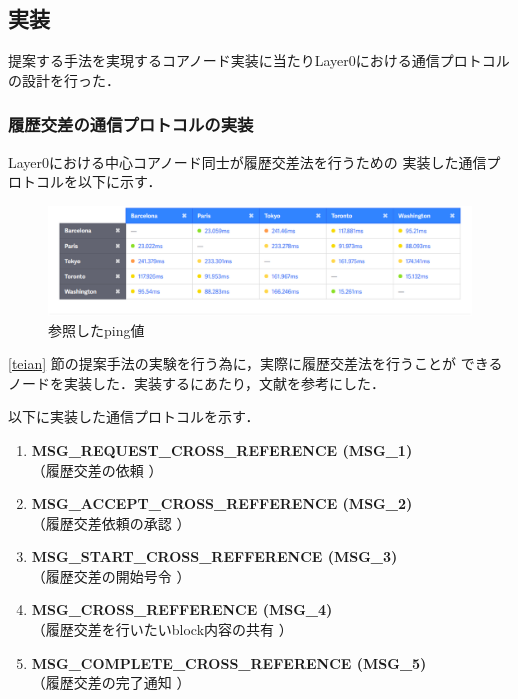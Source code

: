 \documentclass[a4paper,12pt]{jsarticle}
\begin{document}
\subsection{実装}
提案する手法を実現するコアノード実装に当たりLayer0における通信プロトコルの設計を行った．
\subsubsection{履歴交差の通信プロトコルの実装}
\label{syuhou}
Layer0における中心コアノード同士が履歴交差法を行うための
実装した通信プロトコルを以下に示す．
%
\begin{figure}[H]%
  \begin{center}
    \includegraphics[width=160mm]{pht/Screenshot.eps}
  \end{center}
	\caption{参照したping値\cite{pings}}
  \label{fig:pings}
\end{figure}
%
\ref{teian} 節の提案手法の実験を行う為に，実際に履歴交差法を行うことが
できるノードを実装した．実装するにあたり，文献\cite{hamatsu2018}を参考にした．

以下に実装した通信プロトコルを示す．

\hspace{5mm}
%
\begin{enumerate}
\item \textbf{MSG\_REQUEST\_CROSS\_REFERENCE (MSG\_1)}\\
\hspace{12mm} （履歴交差の依頼 ）
\item \textbf{MSG\_ACCEPT\_CROSS\_REFFERENCE (MSG\_2)}\\
\hspace{12mm}  （履歴交差依頼の承認 ）
  \item \textbf{MSG\_START\_CROSS\_REFFERENCE (MSG\_3)}\\
\hspace{12mm}  （履歴交差の開始号令 ）
  \item \textbf{MSG\_CROSS\_REFFERENCE (MSG\_4)}\\
\hspace{12mm}  （履歴交差を行いたいblock内容の共有 ）
  \item \textbf{MSG\_COMPLETE\_CROSS\_REFERENCE (MSG\_5)} \\
\hspace{12mm}  （履歴交差の完了通知 ）
\end{enumerate}
%
\hspace{5mm}
\end{document}
